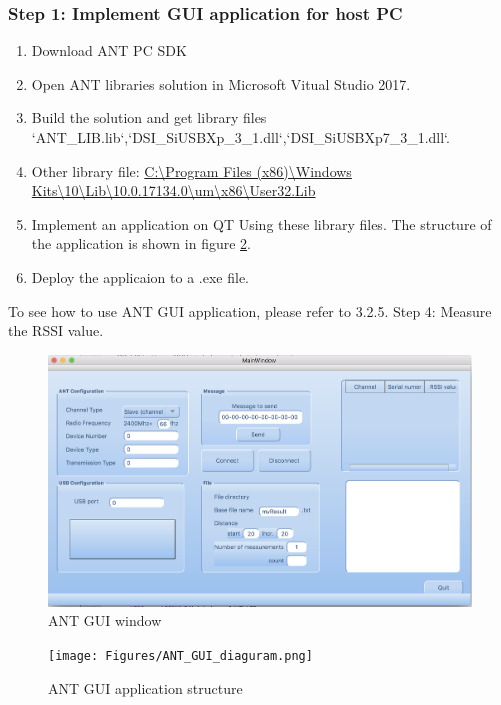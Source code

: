 \documentclass{article}
\begin{document}
\subsubsection{Step 1: Implement GUI application for host PC}
\begin{enumerate}
\item Download ANT PC SDK 
\item Open ANT libraries solution in Microsoft Vitual Studio 2017.
\item  Build the solution and get library files `ANT\_LIB.lib`,`DSI\_SiUSBXp\_3\_1.dll`,`DSI\_SiUSBXp7\_3\_1.dll`.
\item Other library file: \url{C:\Program Files (x86)\Windows Kits\10\Lib\10.0.17134.0\um\x86\User32.Lib}
\item Implement an application on QT Using these library files. The structure of the application is shown in figure \ref{ANT_GUI_diaguram}.
\item Deploy the applicaion to a .exe file.
\end{enumerate}
To see how to use ANT GUI application, please refer to 3.2.5. Step 4: Measure the RSSI value.

\begin{figure}[!h]
\begin{center}
\includegraphics[width=1\columnwidth]{Figures/ANT_GUI_window.png}
\caption{ANT GUI window}
\label{ANT_GUI_window}
\end{center}
\end{figure}

\begin{figure}[!h]
\begin{center}
\texttt{[image: Figures/ANT\_GUI\_diaguram.png]}
\caption{ANT GUI application structure}
\label{ANT_GUI_diaguram}
\end{center}
\end{figure}
\end{document}

